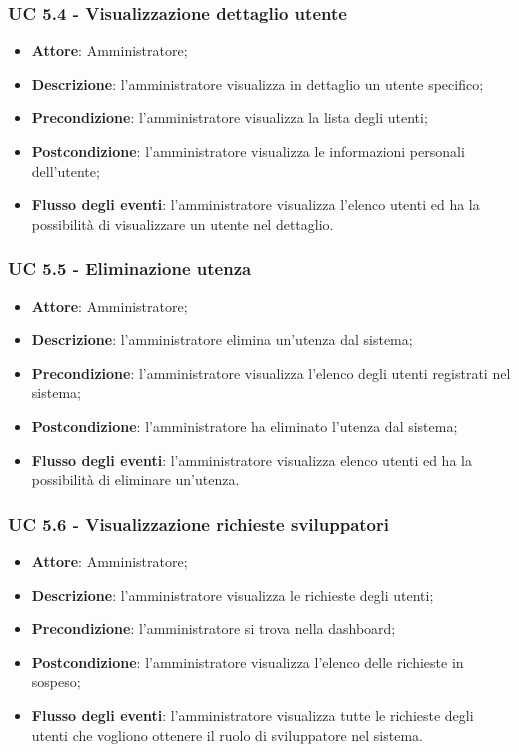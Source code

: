 \subsubsection{UC 5.4 - Visualizzazione dettaglio utente}
\begin{itemize}
\item \textbf{Attore}: Amministratore;
\item \textbf{Descrizione}: l'amministratore visualizza in dettaglio un utente specifico;
\item \textbf{Precondizione}: l'amministratore visualizza la lista degli utenti;
\item \textbf{Postcondizione}: l'amministratore visualizza le informazioni personali dell'utente;
\item \textbf{Flusso degli eventi}: l'amministratore visualizza l'elenco utenti ed ha la possibilità di visualizzare un utente nel dettaglio.
\end{itemize}


\subsubsection{UC 5.5 - Eliminazione utenza}
\begin{itemize}
\item \textbf{Attore}: Amministratore;
\item \textbf{Descrizione}: l'amministratore elimina un'utenza dal sistema;
\item \textbf{Precondizione}: l'amministratore visualizza l'elenco degli utenti registrati nel sistema;
\item \textbf{Postcondizione}: l'amministratore ha eliminato l'utenza dal sistema;
\item \textbf{Flusso degli eventi}: l'amministratore visualizza elenco utenti ed ha la possibilità di eliminare un'utenza.
\end{itemize}


\subsubsection{UC 5.6 - Visualizzazione richieste sviluppatori}
\begin{itemize}
\item \textbf{Attore}: Amministratore;
\item \textbf{Descrizione}: l'amministratore visualizza le richieste degli utenti;
\item \textbf{Precondizione}: l'amministratore si trova nella dashboard;
\item \textbf{Postcondizione}: l'amministratore visualizza l'elenco delle richieste in sospeso;
\item \textbf{Flusso degli eventi}:  l'amministratore visualizza tutte le richieste degli utenti che vogliono ottenere il ruolo di sviluppatore nel sistema.
\end{itemize}

